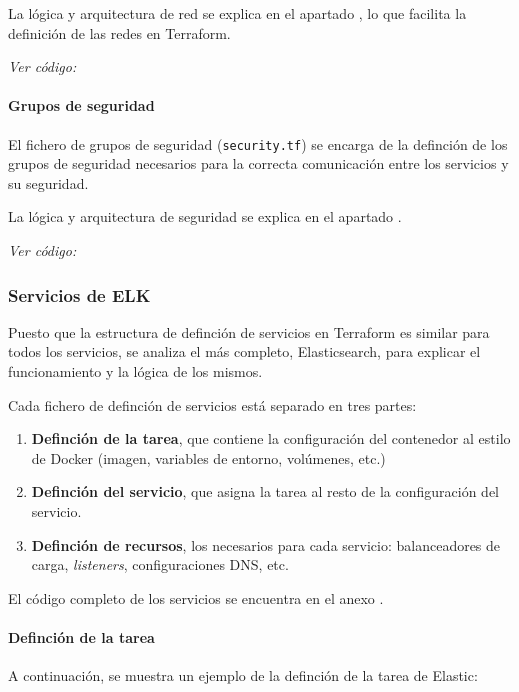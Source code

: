 La lógica y arquitectura de red se explica en el apartado
, lo que facilita la definición de las redes en Terraform.

\textit{Ver código: }


\paragraph{Grupos de seguridad}
El fichero de grupos de seguridad (\texttt{security.tf}) se encarga de la
definción de los grupos de seguridad necesarios para la correcta comunicación
entre los servicios y su seguridad.

La lógica y arquitectura de seguridad se explica en el apartado
.

\textit{Ver código: }


\newpage{}
\subsubsection{Servicios de ELK}
Puesto que la estructura de definción de servicios en Terraform es similar para
todos los servicios, se analiza el más completo, Elasticsearch, para explicar el
funcionamiento y la lógica de los mismos.

Cada fichero de definción de servicios está separado en tres partes:
\begin{enumerate}
	\item \textbf{Definción de la tarea}, que contiene la configuración del
		contenedor al estilo de Docker (imagen, variables de entorno, volúmenes,
		etc.)
	\item \textbf{Definción del servicio}, que asigna la tarea al resto de la
		configuración del servicio.
	\item \textbf{Definción de recursos}, los necesarios para cada servicio:
		balanceadores de carga, \textit{listeners}, configuraciones DNS, etc.
\end{enumerate}

El código completo de los servicios se encuentra en el anexo .

\paragraph{Definción de la tarea}
A continuación, se muestra un ejemplo de la definción de la tarea de Elastic:

